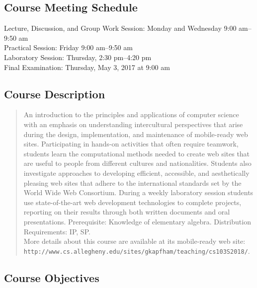 \documentclass[11pt]{article}
\newcommand{\url}[1]{\lstinline{#1}}
\begin{document}
\subsection*{Course Meeting Schedule}

Lecture, Discussion, and Group Work Session: Monday and Wednesday 9:00 am--9:50 am \\
Practical Session: Friday 9:00 am--9:50 am \\
Laboratory Session: Thursday, 2:30 pm--4:20 pm \\
Final Examination: Thursday, May 3, 2017 at 9:00 am

\subsection*{Course Description}

\begin{quote}

An introduction to the principles and applications of computer science with an
emphasis on understanding intercultural perspectives that arise during the
design, implementation, and maintenance of mobile-ready web sites.
Participating in hands-on activities that often require teamwork, students
learn the computational methods needed to create web sites that are useful to
people from different cultures and nationalities. Students also investigate
approaches to developing efficient, accessible, and aesthetically pleasing web
sites that adhere to the international standards set by the World Wide Web
Consortium. During a weekly laboratory session students use state-of-the-art
web development technologies to complete projects, reporting on their results
through both written documents and oral presentations. Prerequisite: Knowledge
of elementary algebra. Distribution Requirements: IP, SP.\@ \\

More details about this course are available at its mobile-ready web site:
\url{http://www.cs.allegheny.edu/sites/gkapfham/teaching/cs103S2018/}.

\end{quote}

\subsection*{Course Objectives}
\end{document}
